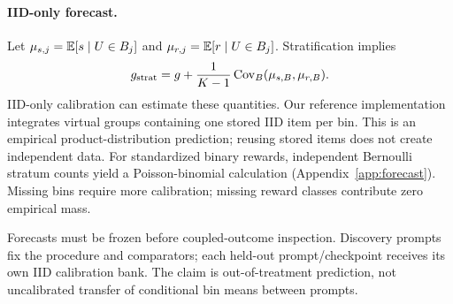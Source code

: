 \paragraph{IID-only forecast.}
Let $\mu_{s,j}=\mathbb{E}[s\mid U\in B_j]$ and $\mu_{r,j}=\mathbb{E}[r\mid U\in B_j]$.
Stratification implies
\begin{equation}
g_{\rm strat}=g+\frac1{K-1}\operatorname{Cov}_B(\mu_{s,B},\mu_{r,B}).\label{eq:forecast}
\end{equation}
IID-only calibration can estimate these quantities. Our reference implementation
integrates virtual groups containing one stored IID item per bin. This is an empirical
product-distribution prediction; reusing stored items does not create independent data.
For standardized binary rewards, independent Bernoulli stratum counts yield a
Poisson-binomial calculation (Appendix~\ref{app:forecast}). Missing bins require more
calibration; missing reward classes contribute zero empirical mass.

Forecasts must be frozen before coupled-outcome inspection. Discovery prompts fix
the procedure and comparators; each held-out prompt/checkpoint receives its own IID
calibration bank. The claim is out-of-treatment prediction, not uncalibrated transfer
of conditional bin means between prompts.
